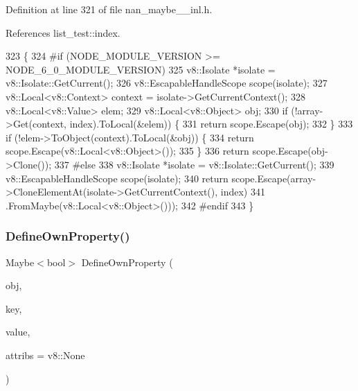 Definition at line 321 of file nan\+\_\+maybe\+\_\+\_\+inl.\+h.



References list\+\_\+test\+::index.


\begin{DoxyCode}
323                     \{
324 \textcolor{preprocessor}{#if (NODE\_MODULE\_VERSION >= NODE\_6\_0\_MODULE\_VERSION)}
325   v8::Isolate *isolate = v8::Isolate::GetCurrent();
326   v8::EscapableHandleScope scope(isolate);
327   v8::Local<v8::Context> context = isolate->GetCurrentContext();
328   v8::Local<v8::Value> elem;
329   v8::Local<v8::Object> obj;
330   \textcolor{keywordflow}{if} (!array->Get(context, index).ToLocal(&elem)) \{
331     \textcolor{keywordflow}{return} scope.Escape(obj);
332   \}
333   \textcolor{keywordflow}{if} (!elem->ToObject(context).ToLocal(&obj)) \{
334     \textcolor{keywordflow}{return} scope.Escape(v8::Local<v8::Object>());
335   \}
336   \textcolor{keywordflow}{return} scope.Escape(obj->Clone());
337 \textcolor{preprocessor}{#else}
338   v8::Isolate *isolate = v8::Isolate::GetCurrent();
339   v8::EscapableHandleScope scope(isolate);
340   \textcolor{keywordflow}{return} scope.Escape(array->CloneElementAt(isolate->GetCurrentContext(), index)
341                           .FromMaybe(v8::Local<v8::Object>()));
342 \textcolor{preprocessor}{#endif}
343 \}
\end{DoxyCode}
\mbox{\label{nan__maybe__43__inl_8h_aa95364674128f0f917e2886d0ecae6a1}} 
\subsubsection{Define\+Own\+Property()}
{\footnotesize\ttfamily Maybe$<$bool$>$ Define\+Own\+Property (\begin{DoxyParamCaption}\item[{v8\+::\+Local$<$ v8\+::\+Object $>$}]{obj,  }\item[{v8\+::\+Local$<$ v8\+::\+String $>$}]{key,  }\item[{v8\+::\+Local$<$ v8\+::\+Value $>$}]{value,  }\item[{v8\+::\+Property\+Attribute}]{attribs = {\ttfamily v8\+:\+:None} }\end{DoxyParamCaption})}



